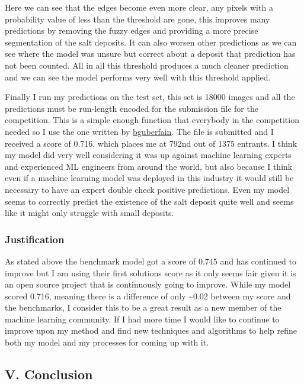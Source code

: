\documentclass[11pt]{article}
\begin{document}
Here we can see that the edges become even more clear, any pixels with a
probability value of less than the threshold are gone, this improves
many predictions by removing the fuzzy edges and providing a more
precise segmentation of the salt deposits. It can also worsen other
predictions as we can see where the model was unsure but correct about a
deposit that prediction has not been counted. All in all this threshold
produces a much cleaner prediction and we can see the model performs
very well with this threshold applied.

Finally I run my predictions on the test set, this set is 18000 images
and all the predictions must be run-length encoded for the submission
file for the competition. This is a simple enough function that
everybody in the competition needed so I use the one written by
\href{https://www.kaggle.com/bguberfain/unet-with-depth}{bguberfain}.
The file is submitted and I received a score of 0.716, which places me
at 792nd out of 1375 entrants. I think my model did very well
considering it was up against machine learning experts and experienced
ML engineers from around the world, but also because I think even if a
machine learning model was deployed in this industry it would still be
necessary to have an expert double check positive predictions. Even my
model seems to correctly predict the existence of the salt deposit quite
well and seems like it might only struggle with small deposits.

\subsubsection{Justification}\label{justification}

As stated above the benchmark model got a score of 0.745 and has
continued to improve but I am using their first solutions score as it
only seems fair given it is an open source project that is continuously
going to improve. While my model scored 0.716, meaning there is a
difference of only \textasciitilde{}0.02 between my score and the
benchmarks, I consider this to be a great result as a new member of the
machine learning community. If I had more time I would like to continue
to improve upon my method and find new techniques and algorithms to help
refine both my model and my processes for coming up with it.

\subsection{V. Conclusion}\label{v.-conclusion}
\end{document}
